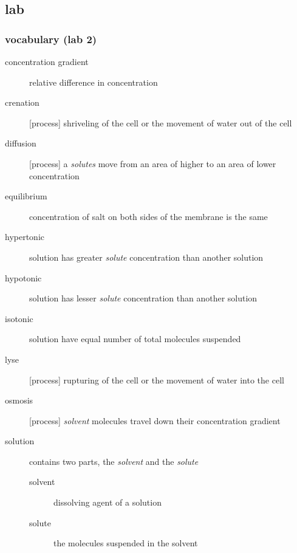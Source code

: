 \documentclass[11pt]{article}
\begin{document}
\subsection{lab}
\label{sec:org084b1d6}
\subsubsection{vocabulary (lab 2)}
\label{sec:orgc500aa2}

\begin{description}
\item[{concentration gradient}] relative difference in concentration

\item[{crenation}] [process] shriveling of the cell or the movement of water out of
the cell

\item[{diffusion}] [process] a \emph{solutes} move from an area of higher to an area of
lower concentration

\item[{equilibrium}] concentration of salt on both sides of the membrane is the same

\item[{hypertonic}] solution has greater \emph{solute} concentration than another
solution

\item[{hypotonic}] solution has lesser \emph{solute} concentration than another solution

\item[{isotonic}] solution have equal number of total molecules suspended

\item[{lyse}] [process] rupturing of the cell or the movement of water into the
cell

\item[{osmosis}] [process] \emph{solvent} molecules travel down their concentration
gradient

\item[{solution}] contains two parts, the \emph{solvent} and the \emph{solute}

\begin{description}
\item[{solvent}] dissolving agent of a solution

\item[{solute}] the molecules suspended in the solvent
\end{description}
\end{description}
\end{document}
